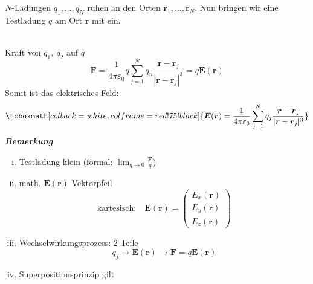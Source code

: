 \documentclass[titlepage,11pt,a4paper,ngerman]{report}
\newcommand{\tx}[1]{\textrm{#1}}
\newcommand{\summ}[2]{\sum_{#1}^{#2}}
\renewcommand{\vec}[1]{\boldsymbol{#1}}
\renewcommand{\epsilon}{\varepsilon}
\newcommand{\rmbox}[1]{\tcboxmath[colback=white,colframe=red!75!black]{#1}}
\begin{document}
\begin{minipage}{.5\linewidth}
	$N$-Ladungen $q_1, \dots, q_N$ ruhen an den Orten $\vec{r}_1, \dots, \vec{r}_N$. Nun bringen wir eine Testladung $q$ am Ort $\vec{r}$ mit ein. 
\end{minipage}%
\begin{minipage}{.5\linewidth}
	\hspace{50pt}
\end{minipage}%
\\
Kraft von $q_1,\ q_2$ auf $q$
$$\vec{F} = \frac{1}{4\pi \epsilon_0} q \summ{j = 1}{N} q_n \frac{\vec{r} - \vec{r}_j}{|\vec{r} - \vec{r}_j|^3} = q \vec{E}(\vec{r})$$
Somit ist das elektrisches Feld:
$$\rmbox{\vec{E}(\vec{r}) = \frac{1}{4 \pi \epsilon_0} \summ{j = 1}{N} q_j \frac{\vec{r} - \vec{r}_j}{|\vec{r} - \vec{r}_j|^3}}$$
\textbf{\emph{Bemerkung}}
\begin{enumerate}[i)]
	\item Testladung klein (formal: $ \lim_{q\to0}\frac{\vec{F}}{q} $)
	\item math. $ \vec{E}(\vec{r}) $ Vektorpfeil\\
	\begin{equation*}
	\tx{kartesisch:} \quad \vec{E}(\vec{r}) = \begin{pmatrix}
	E_x(\vec{r}) \\ E_y(\vec{r}) \\ E_z(\vec{r})
	\end{pmatrix}
	\end{equation*}
	\item Wechselwirkungsprozess: 2 Teile
	\begin{equation*}
	q_j \rightarrow \vec{E}(\vec{r}) \rightarrow \vec{F} = q \vec{E} (\vec{r})
	\end{equation*}
	\item Superpositionsprinzip gilt
\end{enumerate}
\end{document}
